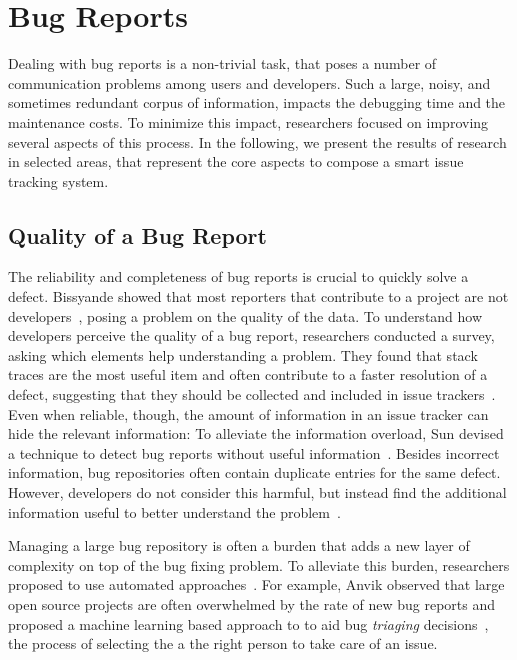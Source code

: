 \section{Bug Reports}\label{sec:related-reports}

Dealing with bug reports is a non-trivial task, that poses a number of communication problems among users and developers.
Such a large, noisy, and sometimes redundant corpus of information, impacts the debugging time and the maintenance costs.
To minimize this impact, researchers focused on improving several aspects of this process.
In the following, we present the results of research in selected areas, that represent the core aspects to compose a smart issue tracking system.


\subsection{Quality of a Bug Report}

The reliability and completeness of bug reports is crucial to quickly solve a defect.
Bissyande \etal showed that most reporters that contribute to a project are not developers~\cite{Biss2013b}, posing a problem on the quality of the data.
To understand how developers perceive the quality of a bug report, researchers conducted a survey, asking which elements help understanding a problem.
They found that stack traces are the most useful item and often contribute to a faster resolution of a defect, suggesting that they should be collected and included in issue trackers~\cite{Zimm2010a,Bett2007,Schr2010a}.
Even when reliable, though, the amount of information in an issue tracker can hide the relevant information: To alleviate the information overload, Sun devised a technique to detect bug reports without useful information~\cite{Sun2011}.
Besides incorrect information, bug repositories often contain duplicate entries for the same defect.
However, developers do not consider this harmful, but instead find the additional information useful to better understand the problem~\cite{Bett2008a}.

Managing a large bug repository is often a burden that adds a new layer of complexity on top of the bug fixing problem.
To alleviate this burden, researchers proposed to use automated approaches~\cite{Weim2006}.
For example, Anvik \etal observed that large open source projects are often overwhelmed by the rate of new bug reports and proposed a machine learning based approach to to aid bug \emph{triaging} decisions~\cite{Anvi2006a}, the process of selecting the a the right person to take care of an issue.

